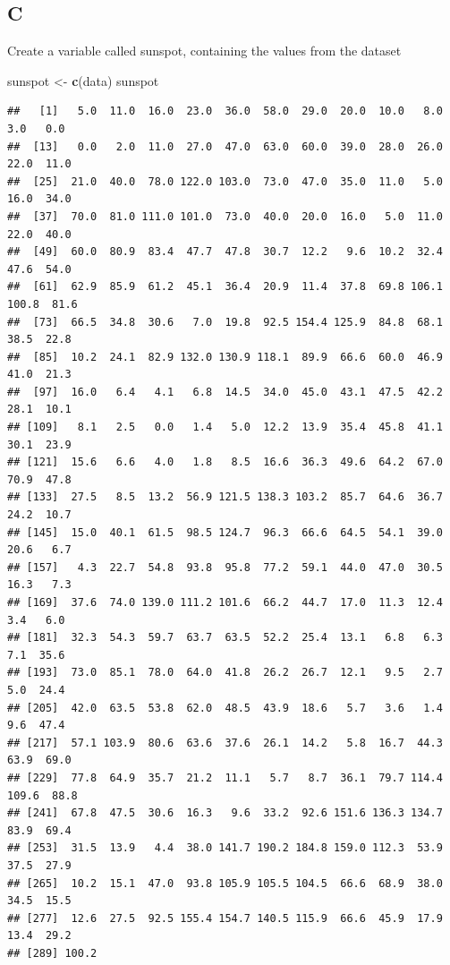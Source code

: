 \documentclass[
]{article}
\newenvironment{Shaded}{\begin{snugshade}}{\end{snugshade}}
\newcommand{\FunctionTok}[1]{\textcolor[rgb]{0.13,0.29,0.53}{\textbf{#1}}}
\newcommand{\NormalTok}[1]{#1}
\newcommand{\OtherTok}[1]{\textcolor[rgb]{0.56,0.35,0.01}{#1}}
\begin{document}
\hypertarget{c}{%
\subsection{C}\label{c}}

Create a variable called sunspot, containing the values from the dataset

\begin{Shaded}
\begin{Highlighting}[]
\NormalTok{sunspot }\OtherTok{\textless{}{-}} \FunctionTok{c}\NormalTok{(data)}
\NormalTok{sunspot}
\end{Highlighting}
\end{Shaded}

\begin{verbatim}
##   [1]   5.0  11.0  16.0  23.0  36.0  58.0  29.0  20.0  10.0   8.0   3.0   0.0
##  [13]   0.0   2.0  11.0  27.0  47.0  63.0  60.0  39.0  28.0  26.0  22.0  11.0
##  [25]  21.0  40.0  78.0 122.0 103.0  73.0  47.0  35.0  11.0   5.0  16.0  34.0
##  [37]  70.0  81.0 111.0 101.0  73.0  40.0  20.0  16.0   5.0  11.0  22.0  40.0
##  [49]  60.0  80.9  83.4  47.7  47.8  30.7  12.2   9.6  10.2  32.4  47.6  54.0
##  [61]  62.9  85.9  61.2  45.1  36.4  20.9  11.4  37.8  69.8 106.1 100.8  81.6
##  [73]  66.5  34.8  30.6   7.0  19.8  92.5 154.4 125.9  84.8  68.1  38.5  22.8
##  [85]  10.2  24.1  82.9 132.0 130.9 118.1  89.9  66.6  60.0  46.9  41.0  21.3
##  [97]  16.0   6.4   4.1   6.8  14.5  34.0  45.0  43.1  47.5  42.2  28.1  10.1
## [109]   8.1   2.5   0.0   1.4   5.0  12.2  13.9  35.4  45.8  41.1  30.1  23.9
## [121]  15.6   6.6   4.0   1.8   8.5  16.6  36.3  49.6  64.2  67.0  70.9  47.8
## [133]  27.5   8.5  13.2  56.9 121.5 138.3 103.2  85.7  64.6  36.7  24.2  10.7
## [145]  15.0  40.1  61.5  98.5 124.7  96.3  66.6  64.5  54.1  39.0  20.6   6.7
## [157]   4.3  22.7  54.8  93.8  95.8  77.2  59.1  44.0  47.0  30.5  16.3   7.3
## [169]  37.6  74.0 139.0 111.2 101.6  66.2  44.7  17.0  11.3  12.4   3.4   6.0
## [181]  32.3  54.3  59.7  63.7  63.5  52.2  25.4  13.1   6.8   6.3   7.1  35.6
## [193]  73.0  85.1  78.0  64.0  41.8  26.2  26.7  12.1   9.5   2.7   5.0  24.4
## [205]  42.0  63.5  53.8  62.0  48.5  43.9  18.6   5.7   3.6   1.4   9.6  47.4
## [217]  57.1 103.9  80.6  63.6  37.6  26.1  14.2   5.8  16.7  44.3  63.9  69.0
## [229]  77.8  64.9  35.7  21.2  11.1   5.7   8.7  36.1  79.7 114.4 109.6  88.8
## [241]  67.8  47.5  30.6  16.3   9.6  33.2  92.6 151.6 136.3 134.7  83.9  69.4
## [253]  31.5  13.9   4.4  38.0 141.7 190.2 184.8 159.0 112.3  53.9  37.5  27.9
## [265]  10.2  15.1  47.0  93.8 105.9 105.5 104.5  66.6  68.9  38.0  34.5  15.5
## [277]  12.6  27.5  92.5 155.4 154.7 140.5 115.9  66.6  45.9  17.9  13.4  29.2
## [289] 100.2
\end{verbatim}
\end{document}
